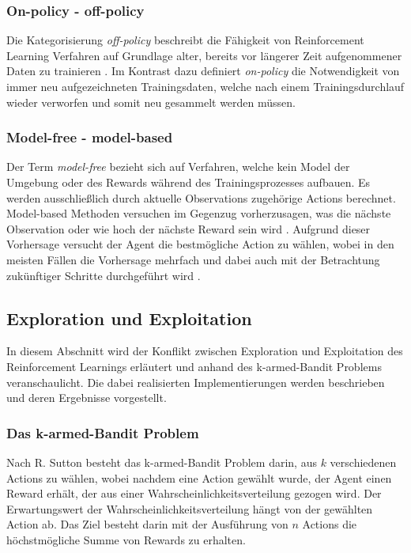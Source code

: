 \documentclass[11pt]{scrartcl}
\begin{document}
\subsubsection{On-policy - off-policy}
Die Kategorisierung \textit{off-policy} beschreibt die Fähigkeit von Reinforcement Learning Verfahren auf
Grundlage alter, bereits vor längerer Zeit aufgenommener Daten zu trainieren \cite[~S.NA]{L2018}. 
Im Kontrast dazu definiert \textit{on-policy} die Notwendigkeit von immer neu aufgezeichneten 
Trainingsdaten, welche nach einem Trainingsdurchlauf wieder verworfen und somit neu gesammelt
werden müssen.


\subsubsection{Model-free - model-based}
Der Term \textit{model-free} bezieht sich auf Verfahren, welche kein Model der Umgebung oder des Rewards
während des Trainingsprozesses aufbauen. Es werden ausschließlich durch aktuelle Observations
zugehörige Actions berechnet. Model-based Methoden versuchen im Gegenzug vorherzusagen, was 
die nächste Observation oder wie hoch der nächste Reward sein wird \cite[~S.NA]{L2018}. Aufgrund dieser
Vorhersage versucht der Agent die bestmögliche Action zu wählen, wobei in den meisten
Fällen die Vorhersage mehrfach und dabei auch mit der Betrachtung zukünftiger Schritte durchgeführt
wird \cite[~S.NA]{L2018}.


\subsection{Exploration und Exploitation}
In diesem Abschnitt wird der Konflikt zwischen Exploration und Exploitation des
Reinforcement Learnings erläutert und anhand des k-armed-Bandit Problems veranschaulicht.
Die dabei realisierten Implementierungen werden beschrieben und deren Ergebnisse
vorgestellt.


\subsubsection{Das k-armed-Bandit Problem}
Nach R. Sutton \cite[~S.26]{SB1998} besteht das k-armed-Bandit Problem darin, aus $k$
verschiedenen Actions zu wählen, wobei nachdem eine Action gewählt wurde, der Agent einen
Reward erhält, der aus einer Wahrscheinlichkeitsverteilung gezogen wird. Der
Erwartungswert der Wahrscheinlichkeitsverteilung hängt von der gewählten Action ab. Das
Ziel besteht darin mit der Ausführung von $n$ Actions die höchstmögliche Summe von Rewards
zu erhalten.
\end{document}
